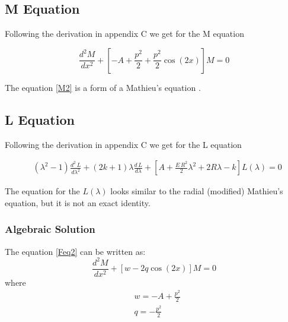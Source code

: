 \subsection{ M Equation }

Following the derivation in appendix C we get for the M equation

\begin{equation}\label{Feq2}
\frac{d^2 M}{d x^2} + \left[-A + \frac{p^2}{2} + \frac{p^2}{2}\cos(2x) \right]M = 0 
\end{equation}

The equation \eqref{M2} is a form of a  Mathieu's equation \cite{Mathieu2}. 

\subsection{ L Equation }

Following the derivation in appendix C we get for the L equation

\begin{equation}\label{L2-2}
\begin{split}
& (\lambda^2-1)\frac{d^2\,L}{d\lambda^2} + (2k+1)\lambda \frac{d\,L}{d\lambda} +  \left[A + \frac{E\,R^2}{2}\lambda^2 + 2R\lambda  -k \right]L(\lambda) = 0
\end{split}
\end{equation}

The equation for the $ L(\lambda) $ looks similar to the radial (modified) Mathieu's equation, but it is not an exact identity. 

\subsubsection{Algebraic Solution}

The equation \eqref{Feq2} can be written as:
\begin{equation}\label{FeqM }
\frac{d^2 M}{d x^2} + \left[w - 2q\cos(2x)\right]M = 0
\end{equation}
where
\begin{equation}
\begin{split}
& w = - A + \frac{p^2}{2} \\[.7em]
& q = - \frac{p^2}{2}
\end{split}
\end{equation}

